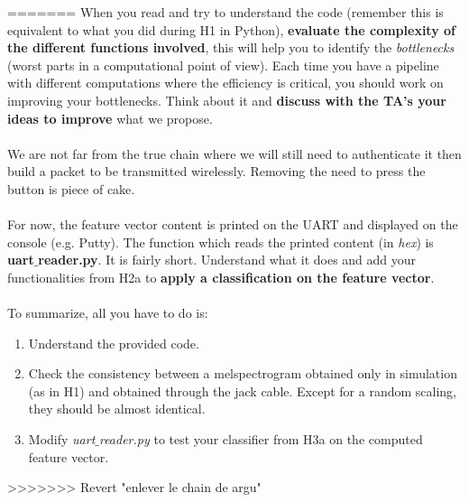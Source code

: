 =======
When you read and try to understand the code (remember this is equivalent to what you did during H1 in Python), \textbf{evaluate the complexity of the different functions involved}, this will help you to identify the \emph{bottlenecks} (worst parts in a computational point of view). Each time you have a pipeline with different computations where the efficiency is critical, you should work on improving your bottlenecks. Think about it and \textbf{discuss with the TA's your ideas to improve} what we propose. \\
\\
We are not far from the true chain where we will still need to authenticate it then build a packet to be transmitted wirelessly. Removing the need to press the button is piece of cake. \\
\\
For now, the feature vector content is printed on the UART and displayed on the console (e.g. Putty). The function which reads the printed content (in \emph{hex}) is \textbf{uart$\_$reader.py}. It is fairly short. Understand what it does and add your functionalities from H2a to \textbf{apply a classification on the feature vector}. \\
\\
%
\noindent To summarize, all you have to do is:
\begin{enumerate}
    \item Understand the provided code.
    \item Check the consistency between a melspectrogram obtained only in simulation (as in H1) and obtained through the jack cable. Except for a random scaling, they should be almost identical.
    \item Modify \emph{uart$\_$reader.py} to test your classifier from H3a on the computed feature vector.
\end{enumerate}
>>>>>>> Revert "enlever le chain de argu"
